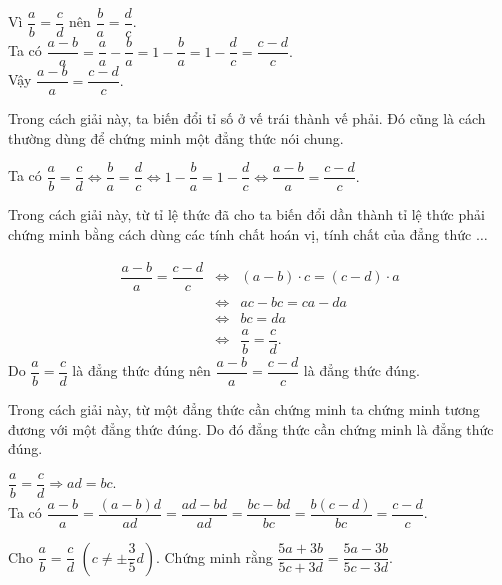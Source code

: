 \begin{vd}
{\begin{description}
\begin{note}
			\end{note}
			\item [\emph{Cách 4:}] Vì $\dfrac{a}{b}=\dfrac{c}{d}$ nên $\dfrac{b}{a}=\dfrac{d}{c}.$\\
			Ta có $\dfrac{a-b}{a}=\dfrac{a}{a}-\dfrac{b}{a}=1-\dfrac{b}{a}=1-\dfrac{d}{c}=\dfrac{c-d}{c}.$\\
			Vậy $\dfrac{a-b}{a}=\dfrac{c-d}{c}.$
			\begin{note}
				Trong cách giải này, ta biến đổi tỉ số ở vế trái thành vế phải. Đó cũng là cách thường dùng để chứng minh một đẳng thức nói chung.
			\end{note}
			\item [\emph{Cách 5:}] Ta có $\dfrac{a}{b}=\dfrac{c}{d} \Leftrightarrow \dfrac{b}{a}=\dfrac{d}{c} \Leftrightarrow 1-\dfrac{b}{a}=1-\dfrac{d}{c} \Leftrightarrow \dfrac{a-b}{a}=\dfrac{c-d}{c}.$
			\begin{note}
				Trong cách giải này, từ tỉ lệ thức đã cho ta biến đổi dần thành tỉ lệ thức phải chứng minh bằng cách dùng các tính chất hoán vị, tính chất của đẳng thức $\dots$
			\end{note}
			\item [\emph{Cách 6:}] 
				\begin{eqnarray*}
					\dfrac{a-b}{a}=\dfrac{c-d}{c}
					& \Leftrightarrow & (a-b) \cdot c = (c-d) \cdot a\\
					& \Leftrightarrow & ac-bc=ca-da \\
					& \Leftrightarrow & bc=da\\
				    & \Leftrightarrow & \dfrac{a}{b}=\dfrac{c}{d}.
			    \end{eqnarray*}
		    Do $\dfrac{a}{b}=\dfrac{c}{d}$ là đẳng thức đúng nên $\dfrac{a-b}{a}=\dfrac{c-d}{c}$ là đẳng thức đúng.
		    \begin{note}
		    	Trong cách giải này, từ một đẳng thức cần chứng minh ta chứng minh tương đương với một đẳng thức đúng. Do đó đẳng thức cần chứng minh là đẳng thức đúng. 		    
	    	\end{note}
    	\item [\emph{Cách 7:}] $\dfrac{a}{b}=\dfrac{c}{d} \Rightarrow ad=bc.$\\
    	Ta có $\dfrac{a-b}{a}=\dfrac{(a-b)d}{ad}=\dfrac{ad-bd}{ad}=\dfrac{bc-bd}{bc}=\dfrac{b(c-d)}{bc}=\dfrac{c-d}{c}.$
		\end{description}
	}
\end{vd}
\begin{vd}
	Cho $\dfrac{a}{b}=\dfrac{c}{d}$ $\left(c \ne \pm \dfrac{3}{5}d\right)$. Chứng minh rằng $\dfrac{5a+3b}{5c+3d}=\dfrac{5a-3b}{5c-3d}.$
\end{vd}
